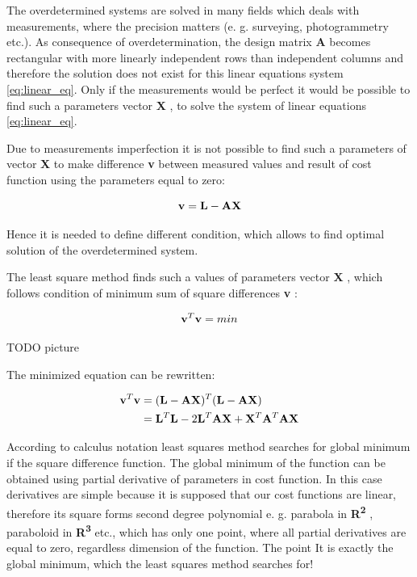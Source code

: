 \documentclass[a4paper,12pt]{report}
\newcommand{\ematr}[1]{
{\bf #1}
}
\newcommand{\evect}[1]{
{\bf #1}
}
\newcommand{\eucl}[1]{
{\bf R\textsuperscript{#1}}
}
\begin{document}
The overdetermined systems are solved in many fields which deals with measurements, where the precision matters (e. g. 
surveying, photogrammetry etc.).
As consequence of overdetermination, the design matrix \ematr{A} becomes rectangular with more linearly independent rows than independent columns 
and therefore the solution does not exist for this linear equations system \eqref{eq:linear_eq}.
Only if the measurements would be perfect it would be possible to find such a parameters vector \evect{X}, to 
solve the system of linear equations \eqref{eq:linear_eq}. 

Due to measurements imperfection it is not possible to find such a parameters of vector \evect{X} to make difference \evect{v} between measured values and 
result of cost function using the parameters equal to zero:

\begin{equation}
\label{eq:least_v}
\evect{v} = \evect{L} - \ematr{A}\evect{X}
\end{equation} 



Hence it is needed to define different condition, which allows to find optimal solution of the 
overdetermined system.

The least square method finds such a values of parameters vector \evect{X}, which 
follows condition of minimum sum of square differences \evect{v}: 

\begin{equation}
\evect{v}^{T} \evect{v} = min
\end{equation} 

TODO picture

The minimized equation can be rewritten:

\begin{equation}
\begin{split}
\evect{v}^{T} \evect{v} &= (\evect{L} - \ematr{A}\ematr{X})^{T} (\evect{L} - \ematr{A}\ematr{X}) \\
&= \evect{L}^{T} \evect{L} - 2 \evect{L}^{T} \ematr{A} \evect{X} + \evect{X}^{T} \ematr{A}^{T} \ematr{A} \evect{X}
\label{eq:least_be_part}
\end{split}
\end{equation} 

According to calculus notation least squares method searches for global minimum if the square difference function. 
The global minimum of the function can be obtained using partial derivative of parameters in cost function.
In this case derivatives are simple because it is supposed that our cost functions are linear, therefore 
its square forms  second degree polynomial e. g. parabola in \eucl{2}, paraboloid in \eucl{3} etc., which has
only one point, where all partial derivatives are equal to zero, regardless dimension of the function. The point It is 
exactly the global minimum, which the least squares method searches for!
\end{document}

